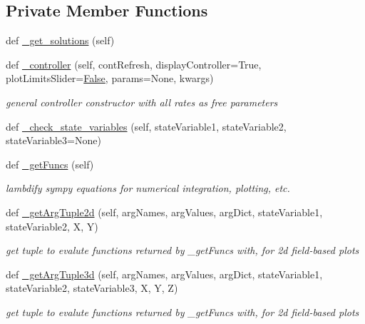 \subsection*{Private Member Functions}
\begin{DoxyCompactItemize}
\item 
def \hyperlink{class_mu_mo_t_1_1_mu_mo_t_1_1_mu_mo_tmodel_ac8f6319b8c81e7c48d1f892603bcd307}{\+\_\+get\+\_\+solutions} (self)
\item 
def \hyperlink{class_mu_mo_t_1_1_mu_mo_t_1_1_mu_mo_tmodel_a4b8c84d4acb2f972908c67cd8dcf2a8e}{\+\_\+controller} (self, cont\+Refresh, display\+Controller=True, plot\+Limits\+Slider=\hyperlink{namespace_mu_mo_t_1_1_mu_mo_t_a36cde68b055f3f2ee671020af4ccf4e2}{False}, params=None, kwargs)
\begin{DoxyCompactList}\small\item\em general controller constructor with all rates as free parameters \end{DoxyCompactList}\item 
def \hyperlink{class_mu_mo_t_1_1_mu_mo_t_1_1_mu_mo_tmodel_abef2b7019d8de30c16d7ade84ad45e09}{\+\_\+check\+\_\+state\+\_\+variables} (self, state\+Variable1, state\+Variable2, state\+Variable3=None)
\item 
def \hyperlink{class_mu_mo_t_1_1_mu_mo_t_1_1_mu_mo_tmodel_aa69fe5568e12577be5a63232d689e45e}{\+\_\+get\+Funcs} (self)
\begin{DoxyCompactList}\small\item\em lambdify sympy equations for numerical integration, plotting, etc. \end{DoxyCompactList}\item 
def \hyperlink{class_mu_mo_t_1_1_mu_mo_t_1_1_mu_mo_tmodel_a0965e5e61aa8f0d4e399e3b534d31a4c}{\+\_\+get\+Arg\+Tuple2d} (self, arg\+Names, arg\+Values, arg\+Dict, state\+Variable1, state\+Variable2, X, Y)
\begin{DoxyCompactList}\small\item\em get tuple to evalute functions returned by \+\_\+get\+Funcs with, for 2d field-\/based plots \end{DoxyCompactList}\item 
def \hyperlink{class_mu_mo_t_1_1_mu_mo_t_1_1_mu_mo_tmodel_a4a81885dd0451b6af31285c234b61d2a}{\+\_\+get\+Arg\+Tuple3d} (self, arg\+Names, arg\+Values, arg\+Dict, state\+Variable1, state\+Variable2, state\+Variable3, X, Y, Z)
\begin{DoxyCompactList}\small\item\em get tuple to evalute functions returned by \+\_\+get\+Funcs with, for 2d field-\/based plots \end{DoxyCompactList}\item 

\end{DoxyCompactItemize}
